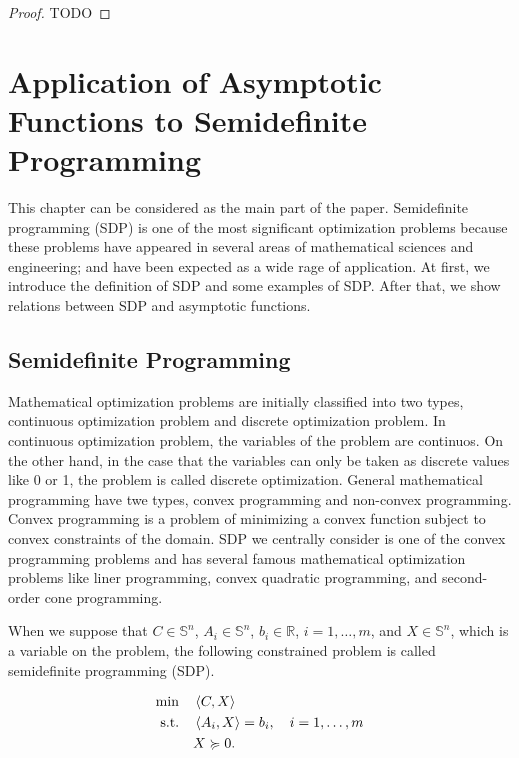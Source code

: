 \documentclass[a4paper,11pt, oneside]{book}
\theoremstyle{definition}
\newcommand{\RealNumberSet}{\mathbb{R}}
\newcommand{\NDemenstionalRealSymmetricMatrixSpace}{\mathbb{S}^n}
\newcommand{\InnerProduct}[2]{\left\langle {#1},{#2}\right\rangle} %
\begin{document}
\begin{proof}
  TODO
\end{proof}

\chapter{Application of Asymptotic Functions to Semidefinite Programming}

This chapter can be considered as the main part of the paper. Semidefinite programming (SDP) is one of the most significant optimization problems because these problems have appeared in several areas of mathematical sciences and engineering; and have been expected as a wide rage of application. At first, we introduce the definition of SDP and some examples of SDP. After that, we show relations between SDP and asymptotic functions.

\section{Semidefinite Programming}

Mathematical optimization problems are initially classified into two types, continuous optimization problem and discrete optimization problem. In continuous optimization problem, the variables of the problem are continuos. On the other hand, in the case that the variables can only be taken as discrete values like 0 or 1, the problem is called discrete optimization. General mathematical programming have twe types, convex programming and non-convex programming. Convex programming is a problem of minimizing a convex function subject to convex constraints of the domain. SDP we centrally consider is one of the convex programming problems and has several famous mathematical optimization problems like liner programming, convex quadratic programming, and second-order cone programming.

When we suppose that $C \in \NDemenstionalRealSymmetricMatrixSpace$, $A_i \in \NDemenstionalRealSymmetricMatrixSpace$, $b_i \in \RealNumberSet$, $i = 1,\dots,m$, and $X \in \NDemenstionalRealSymmetricMatrixSpace$, which is a variable on the problem, the following constrained problem is called semidefinite programming (SDP).

\begin{equation}
  \begin{aligned}
  \min \quad & \InnerProduct{C}{X}\\
  \textrm{s.t.} \quad & \InnerProduct{A_i}{X} = b_i, \quad i = 1,\dots,m\\
    & X \succcurlyeq 0. \\ \notag
  \end{aligned}
\end{equation}
\end{document}
